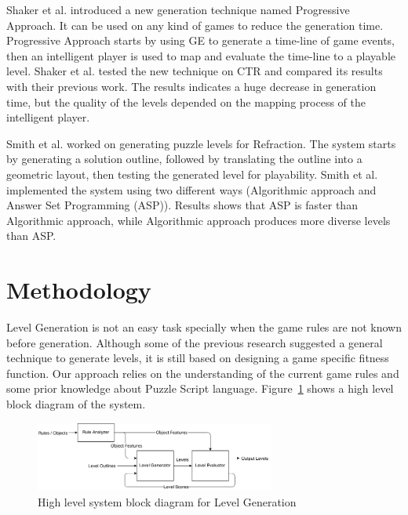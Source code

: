 \documentclass[letterpaper]{article}
\newcommand{\figref}[1]{Figure~\ref{Figure:#1}}
\begin{document}
Shaker et al.\cite{ctrProgressiveApproach} introduced a new generation technique named Progressive Approach. It can be used on any kind of games to reduce the generation time. Progressive Approach starts by using GE to generate a time-line of game events, then an intelligent player is used to map and evaluate the time-line to a playable level. Shaker et al. tested the new technique on CTR and compared its results with their previous work\cite{ctrSimulationApproach}. The results indicates a huge decrease in generation time, but the quality of the levels depended on the mapping process of the intelligent player.\\\par

Smith et al.\cite{refractionStudy} worked on generating puzzle levels for Refraction\cite{refraction}. The system starts by generating a solution outline, followed by translating the outline into a geometric layout, then testing the generated level for playability. Smith et al. implemented the system using two different ways (Algorithmic approach and Answer Set Programming (ASP)). Results shows that ASP is faster than Algorithmic approach, while Algorithmic approach produces more diverse levels than ASP.

\section{Methodology}
Level Generation is not an easy task specially when the game rules are not known before generation. Although some of the previous research suggested a general technique to generate levels, it is still based on designing a game specific fitness function. Our approach relies on the understanding of the current game rules and some prior knowledge about Puzzle Script language. \figref{levelGenBlockDiagram} shows a high level block diagram of the system.\\\par

\begin{figure}[ht]
  	\centering
    \includegraphics[width=0.7\textwidth]{Images/levelGenBlockDiagram}
    \caption{High level system block diagram for Level Generation}
    \label{Figure:levelGenBlockDiagram}
\end{figure}
\end{document}
